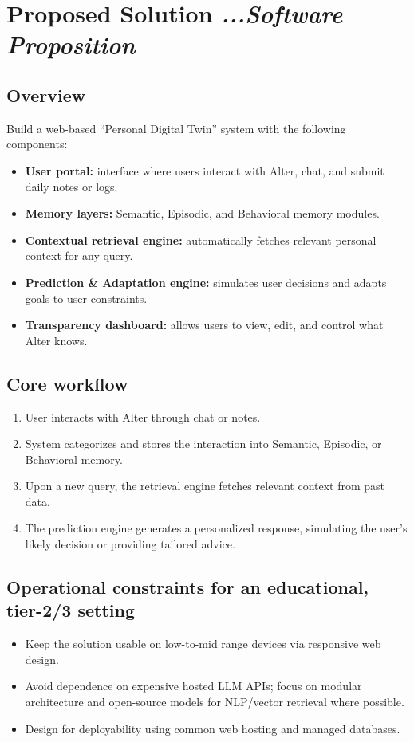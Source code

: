 \documentclass[11pt,a4paper]{article}
\begin{document}
\section[Proposed Solution]{Proposed Solution \hfill \normalsize\normalfont\textit{...Software Proposition}}

\subsection{Overview}
Build a web-based ``Personal Digital Twin'' system with the following components:
\begin{itemize}
    \item \textbf{User portal:} interface where users interact with Alter, chat, and submit daily notes or logs.
    \item \textbf{Memory layers:} Semantic, Episodic, and Behavioral memory modules.
    \item \textbf{Contextual retrieval engine:} automatically fetches relevant personal context for any query.
    \item \textbf{Prediction \& Adaptation engine:} simulates user decisions and adapts goals to user constraints.
    \item \textbf{Transparency dashboard:} allows users to view, edit, and control what Alter knows.
\end{itemize}

\subsection{Core workflow}
\begin{enumerate}
    \item User interacts with Alter through chat or notes.
    \item System categorizes and stores the interaction into Semantic, Episodic, or Behavioral memory.
    \item Upon a new query, the retrieval engine fetches relevant context from past data.
    \item The prediction engine generates a personalized response, simulating the user's likely decision or providing tailored advice.
\end{enumerate}

\subsection{Operational constraints for an educational, tier-2/3 setting}
\begin{itemize}
    \item Keep the solution usable on low-to-mid range devices via responsive web design.
    \item Avoid dependence on expensive hosted LLM APIs; focus on modular architecture and open-source models for NLP/vector retrieval where possible.
    \item Design for deployability using common web hosting and managed databases.
\end{itemize}
\end{document}
